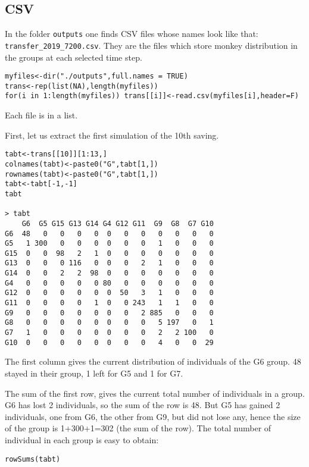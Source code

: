\subsection{CSV}

In the folder \texttt{outputs} one finds CSV files whose names look like that: \texttt{transfer\_2019\_7200.csv}. They are the files which store monkey distribution in the groups at each selected time step.

\begin{lstlisting}
myfiles<-dir("./outputs",full.names = TRUE)
trans<-rep(list(NA),length(myfiles))
for(i in 1:length(myfiles)) trans[[i]]<-read.csv(myfiles[i],header=F)
\end{lstlisting}

Each file is in a list.

First, let us extract the first simulation of the 10th saving.

\begin{lstlisting}
tabt<-trans[[10]][1:13,]
colnames(tabt)<-paste0("G",tabt[1,])
rownames(tabt)<-paste0("G",tabt[1,])
tabt<-tabt[-1,-1]
tabt

> tabt
    G6  G5 G15 G13 G14 G4 G12 G11  G9  G8  G7 G10
G6  48   0   0   0   0  0   0   0   0   0   0   0
G5   1 300   0   0   0  0   0   0   1   0   0   0
G15  0   0  98   2   1  0   0   0   0   0   0   0
G13  0   0   0 116   0  0   0   2   1   0   0   0
G14  0   0   2   2  98  0   0   0   0   0   0   0
G4   0   0   0   0   0 80   0   0   0   0   0   0
G12  0   0   0   0   0  0  50   3   1   0   0   0
G11  0   0   0   0   1  0   0 243   1   1   0   0
G9   0   0   0   0   0  0   0   2 885   0   0   0
G8   0   0   0   0   0  0   0   0   5 197   0   1
G7   1   0   0   0   0  0   0   0   2   2 100   0
G10  0   0   0   0   0  0   0   0   4   0   0  29
\end{lstlisting}

The first column gives the current distribution of individuals of the G6 group. 48 stayed in their group, 1 left for G5 and 1 for G7. 

The sum of the first row, gives the current total number of individuals in a group. G6 has lost 2 individuals, so the sum of the row is 48. But G5 has gained 2 individuals, one from G6, the other from G9, but did not lose any, hence the size of the group is 1+300+1=302 (the sum of the row). The total number of individual in each group is easy to obtain:

\begin{lstlisting}
rowSums(tabt)
\end{lstlisting}
 

